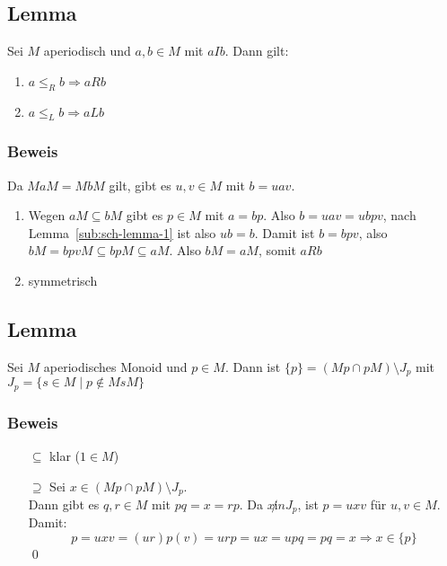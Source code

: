     \subsection{Lemma}
        Sei $M$ aperiodisch und $a,b\in M$ mit $aIb$. Dann gilt:
        \begin{enumerate}
            \item $a\le_R b\Rightarrow aRb$
            \item $a\le_L b\Rightarrow aLb$
        \end{enumerate}
        \subsubsection{Beweis}
            Da $MaM=MbM$ gilt, gibt es $u,v\in M$ mit $b=uav$.
            \begin{enumerate}
                \item Wegen $aM\subseteq bM$ gibt es $p\in M$ mit $a=bp$. Also $b=uav=ubpv$, nach Lemma~\ref{sub:sch-lemma-1} ist also $ub=b$.
                Damit ist $b=bpv$, also $bM=bpvM\subseteq bpM\subseteq aM$. Also $bM=aM$, somit $aRb$
                \item symmetrisch
            \end{enumerate}
    \subsection{Lemma}
        Sei $M$ aperiodisches Monoid und $p\in M$. Dann ist $\{p\}=(Mp\cap pM)\setminus J_p$ mit $J_p=\{s\in M\mid p\not\in MsM\}$
        \subsubsection{Beweis}
            \begin{itemize}
                \item[$\subseteq$] klar ($1\in M$)
                \item[$\supseteq$] Sei $x\in (Mp\cap pM)\setminus J_p$.\\
                Dann gibt es $q,r\in M$ mit $pq=x=rp$. Da $x\not in J_p$, ist $p=uxv$ für $u,v\in M$.\\
                Damit: $$p=uxv=(ur)p(v)=urp=ux=upq=pq=x\Rightarrow x\in\{p\}$$\qed
            \end{itemize}
